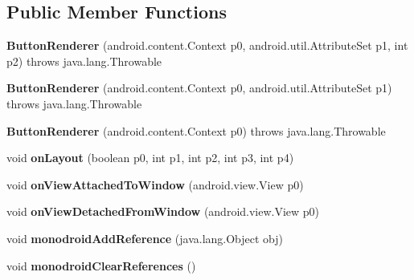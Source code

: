 \subsection*{Public Member Functions}
\begin{DoxyCompactItemize}
\item 
\mbox{\label{classmd5b60ffeb829f638581ab2bb9b1a7f4f3f_1_1ButtonRenderer_a44933cd78b3f547dc6c6282043506ae5}} 
{\bfseries Button\+Renderer} (android.\+content.\+Context p0, android.\+util.\+Attribute\+Set p1, int p2)  throws java.\+lang.\+Throwable 	
\item 
\mbox{\label{classmd5b60ffeb829f638581ab2bb9b1a7f4f3f_1_1ButtonRenderer_ae0d491f966e2aef899b84d42c9d2ae43}} 
{\bfseries Button\+Renderer} (android.\+content.\+Context p0, android.\+util.\+Attribute\+Set p1)  throws java.\+lang.\+Throwable 	
\item 
\mbox{\label{classmd5b60ffeb829f638581ab2bb9b1a7f4f3f_1_1ButtonRenderer_aef5f692cbf4180a0d0683aaaec08d3ae}} 
{\bfseries Button\+Renderer} (android.\+content.\+Context p0)  throws java.\+lang.\+Throwable 	
\item 
\mbox{\label{classmd5b60ffeb829f638581ab2bb9b1a7f4f3f_1_1ButtonRenderer_a32dc12b457387df026545663655ce4b2}} 
void {\bfseries on\+Layout} (boolean p0, int p1, int p2, int p3, int p4)
\item 
\mbox{\label{classmd5b60ffeb829f638581ab2bb9b1a7f4f3f_1_1ButtonRenderer_a545cf2b3c92707d187a93a08903f63ec}} 
void {\bfseries on\+View\+Attached\+To\+Window} (android.\+view.\+View p0)
\item 
\mbox{\label{classmd5b60ffeb829f638581ab2bb9b1a7f4f3f_1_1ButtonRenderer_aebd2e3c0410f099a12739d53789de61b}} 
void {\bfseries on\+View\+Detached\+From\+Window} (android.\+view.\+View p0)
\item 
\mbox{\label{classmd5b60ffeb829f638581ab2bb9b1a7f4f3f_1_1ButtonRenderer_a64b38ed3e683851f4be2246223c6cab5}} 
void {\bfseries monodroid\+Add\+Reference} (java.\+lang.\+Object obj)
\item 
\mbox{\label{classmd5b60ffeb829f638581ab2bb9b1a7f4f3f_1_1ButtonRenderer_a95654f418661c12f44eaabf4ec84d2d0}} 
void {\bfseries monodroid\+Clear\+References} ()
\end{DoxyCompactItemize}
